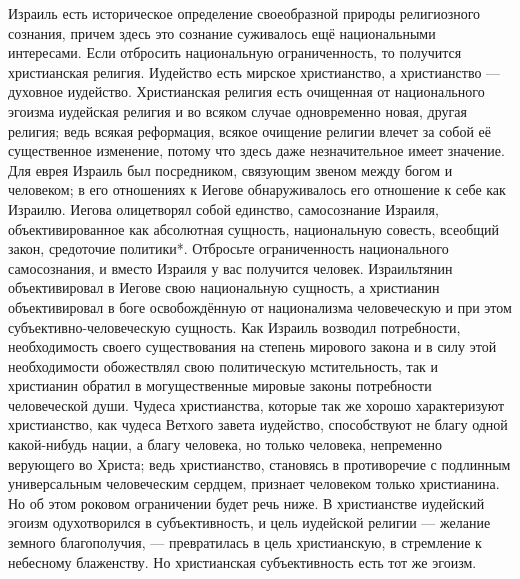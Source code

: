 \documentclass[12pt,oneside]{book}
\begin{document}
Израиль есть историческое определение своеобразной природы религиозного сознания, причем здесь это сознание суживалось ещё национальными интересами. Если отбросить национальную ограниченность, то получится христианская религия. Иудейство есть мирское христианство, а христианство --- духовное иудейство. Христианская религия есть очищенная от национального эгоизма иудейская религия и во всяком случае одновременно новая, другая религия; ведь всякая реформация, всякое очищение религии влечет за собой её существенное изменение, потому что здесь даже незначительное имеет значение. Для еврея Израиль был посредником, связующим звеном между богом и человеком; в его отношениях к Иегове обнаруживалось его отношение к себе как Израилю. Иегова олицетворял собой единство, самосознание Израиля, объективированное как абсолютная сущность, национальную совесть, всеобщий закон, средоточие политики*\let\svthefootnote\thefootnote\let\thefootnote\relax{}\let\thefootnote\svthefootnote. Отбросьте ограниченность национального самосознания, и вместо Израиля у вас получится человек. Израильтянин объективировал в Иегове свою национальную сущность, а христианин объективировал в боге освобождённую от национализма человеческую и при этом субъективно-человеческую сущность\dag\let\svthefootnote\thefootnote\let\thefootnote\relax{}\let\thefootnote\svthefootnote. Как Израиль возводил потребности, необходимость своего существования на степень мирового закона и в силу этой необходимости обожествлял свою политическую мстительность, так и христианин обратил в могущественные мировые законы потребности человеческой души. Чудеса христианства, которые так же хорошо характеризуют христианство, как чудеса Ветхого завета иудейство, способствуют не благу одной какой-нибудь нации, а благу человека, но только человека, непременно верующего во Христа; ведь христианство, становясь в противоречие с подлинным универсальным человеческим сердцем, признает человеком только христианина. Но об этом роковом ограничении будет речь ниже. В христианстве иудейский эгоизм одухотворился в субъективность, и цель иудейской религии --- желание земного благополучия, --- превратилась в цель христианскую, в стремление к небесному блаженству. Но христианская субъективность есть тот же эгоизм.
\end{document}
